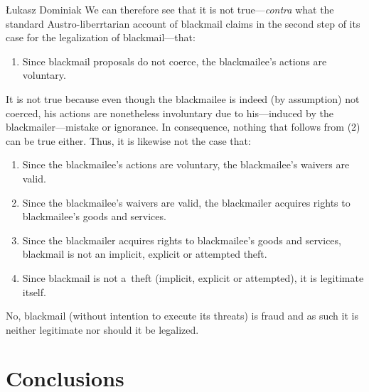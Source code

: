 \begin{artengenv}{Łukasz Dominiak}
We can therefore see that it is not true---\textit{contra} what the standard Austro-liberrtarian account of blackmail claims in the second step of its case for the legalization of blackmail---that:
\begin{enumerate}[label=(\arabic*), start=2]
\item Since blackmail proposals do not coerce, the blackmailee's actions are voluntary.
\end{enumerate}
It is not true because even though the blackmailee is indeed (by assumption) not coerced, his actions are nonetheless involuntary due to his---induced by the blackmailer---mistake or ignorance. In consequence, nothing that follows from (2) can be true either. Thus, it is likewise not the case that:
\begin{enumerate}[label=(\arabic*), start=3]
\item Since the blackmailee's actions are voluntary, the blackmailee's waivers are valid.
\item Since the blackmailee's waivers are valid, the blackmailer acquires rights to blackmailee's goods and services.
\item Since the blackmailer acquires rights to blackmailee's goods and services, blackmail is not an implicit, explicit or attempted theft.
\item Since blackmail is not a~theft (implicit, explicit or attempted), it is legitimate itself.
\end{enumerate}
No, blackmail (without intention to execute its threats) is fraud and as such it is neither legitimate nor should it be legalized.



\section{Conclusions}


\end{artengenv}
